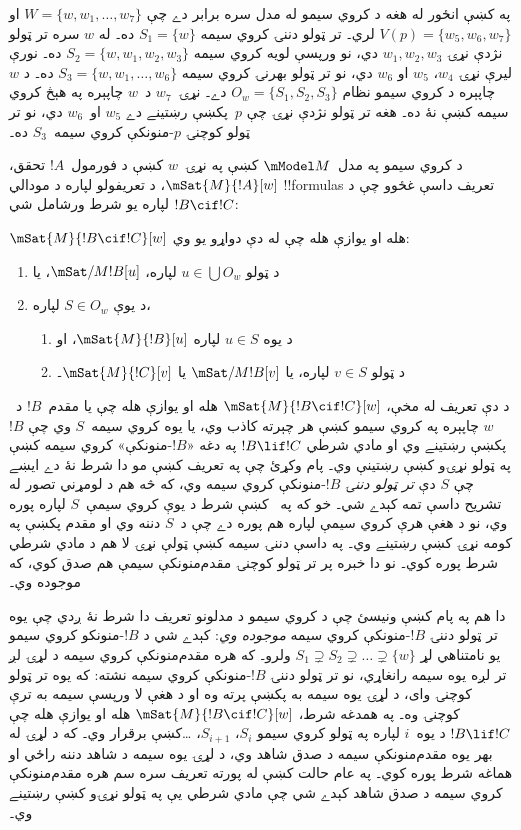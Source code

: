 \documentclass[../../../include/open-logic-section]{subfiles}
\begin{document}
په  کښې انځور له هغه د کروي سيمو له
مدل سره برابر دے چې $W = \{w, w_1, \dots, w_7\}$ او
$V(p) = \{w_5, w_6,
w_7\}$ لري۔ تر ټولو دننۍ کروي سيمه $S_1 = \{w\}$ ده۔
له $w$ سره تر ټولو نژدې نړۍ $w_1, w_2, w_3$ دي، نو ورپسې
لويه کروي سيمه $S_2 = \{w, w_1,
w_2, w_3\}$ ده۔ نورې ليرې نړۍ $w_4$، $w_5$ او $w_6$ دي،
نو تر ټولو بهرنۍ کروي سيمه $S_3 = \{w, w_1, \dots, w_6\}$
ده۔ د $w$ چاپېره د کروي سيمو نظام $O_w = \{S_1, S_2, S_3\}$
دے۔ نړۍ~$w_7$ د~$w$ چاپېره په هېڅ کروي سيمه کښې نۀ ده۔
هغه تر ټولو نژدې نړۍ چې $p$~پکښې رښتينے دے $w_5$ او~$w_6$
دي، نو تر ټولو کوچنۍ $p$-منونکې کروي سيمه~$S_3$ ده۔

د کروي سيمو په مدل~$\mModel M$ کښې په نړۍ~$w$ کښې د
فورمول~$!A$ تحقق، $\mSat{M}{!A}[w]$، د تعريفولو لپاره د
مودالي !!{formula}s تعريف داسې غځوو چې د $!B \cif !C$ لپاره
يو شرط ورشامل شي:

\begin{defn}
  $\mSat{M}{!B \cif !C}[w]$ هله او يوازې هله چې له دې دواړو يو وي:
  \begin{enumerate}
  \item{} د ټولو $u \in \bigcup O_w$ لپاره، $\mSat/{M}{!B}[u]$، يا
  \item{} د يوې $S \in O_w$ لپاره،
    \begin{enumerate}
      \item د يوه $u \in
        S$ لپاره $\mSat{M}{!B}[u]$، او
      \item د ټولو $v \in S$ لپاره، يا
        $\mSat/{M}{!B}[v]$ يا $\mSat{M}{!C}[v]$۔
    \end{enumerate}
  \end{enumerate}
\end{defn}

د دې تعريف له مخې، $\mSat{M}{!B \cif !C}[w]$ هله او يوازې
هله چې يا مقدم~$!B$ د~$w$ چاپېره په کروي سيمو کښې هر چېرته
کاذب وي، يا يوه کروي سيمه~$S$ وي چې $!B$ پکښې رښتينے وي او
مادي شرطي $!B \lif !C$ په دغه «$!B$-منونکې» کروي سيمه کښې
په ټولو نړۍو کښې رښتينې وي۔ پام وکړئ چې په تعريف کښې مو دا
شرط نۀ دے ايښے چې $S$ دې \emph{تر ټولو دننۍ} $!B$-منونکې
کروي سيمه وي، که څه هم د لومړني تصور له تشريح داسې تمه کېدے
شي۔ خو که په~ کښې شرط د يوې کروي
سيمې~$S$ لپاره پوره وي، نو د هغې هرې کروي سيمې لپاره هم
پوره دے چې د~$S$ دننه وي او مقدم پکښې په کومه نړۍ کښې
رښتينے وي۔ په داسې دننۍ سيمه کښې ټولې نړۍ لا هم د مادي
شرطي شرط پوره کوي۔ نو دا خبره پر تر ټولو کوچنۍ
مقدم‌منونکې سيمې هم صدق کوي، که موجوده وي۔

دا هم په پام کښې ونيسئ چې د کروي سيمو د مدلونو تعريف دا
شرط نۀ ږدي چې يوه تر ټولو دننۍ $!B$-منونکې کروي سيمه
\emph{موجوده وي}: کېدے شي د $!B$-منونکو کروي سيمو يو
نامتناهي لړ $S_1 \supsetneq S_2 \supsetneq \dots \supsetneq
\{w\}$ ولرو۔ که هره مقدم‌منونکې کروي سيمه د لړۍ لږ تر
لږه يوه سيمه رانغاړي، نو تر ټولو دننۍ $!B$-منونکې کروي
سيمه نشته: که يوه تر ټولو کوچنۍ وای، د لړۍ يوه سيمه به
پکښې پرته وه او د هغې لا ورپسې سيمه به ترې کوچنۍ وه۔
په همدغه شرط، $\mSat{M}{!B \cif !C}[w]$ هله او يوازې
هله چې $!B \lif !C$ د يوه~$i$ لپاره په ټولو کروي سيمو
$S_i$، $S_{i+1}$، \dots کښې برقرار وي۔ که د لړۍ له بهر
يوه مقدم‌منونکې سيمه د صدق شاهد وي، د لړۍ يوه سيمه د
شاهد دننه راځي او هماغه شرط پوره کوي۔ په عام حالت کښې
له پورته تعريف سره سم هره مقدم‌منونکې کروي سيمه د صدق
شاهد کېدے شي چې مادي شرطي يې په ټولو نړۍو کښې رښتينے وي۔
\end{document}
